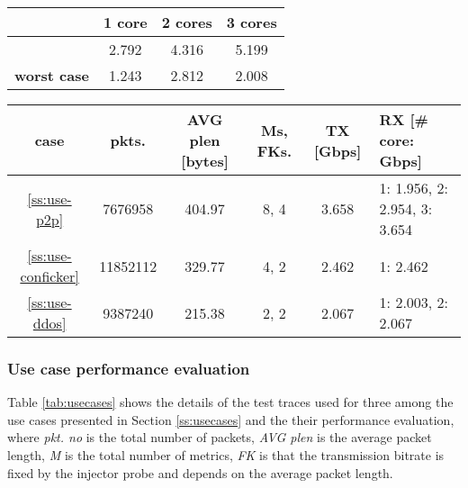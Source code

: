\documentclass[conference,letterpaper]{sig-alternate-10pt}
\begin{document}
\begin{center}
\begin{footnotesize}
\begin{tabular}{ | c | c | c | c| }
\hline
& \textbf{1 core} & \textbf{2 cores} & \textbf{3 cores} \\
\hline
\textbf{\cite{complex}} & 2.792  & 4.316 & 5.199 \\
\hline
\textbf{worst case} & 1.243 & 2.812 & 2.008 \\
\hline
\end{tabular}
\end{footnotesize}
\end{center}

\begin{table*}
\hfill{}
\begin{center}
\begin{footnotesize}
\begin{tabular}{ | c | c | c | c | c | l |}
\hline
\textbf{case} & \textbf{pkts}. & \textbf{AVG plen [bytes]} & \textbf{Ms, FKs.}& \textbf{TX [Gbps]} & \textbf{RX [\# core: Gbps]}\\
\hline
\ref{ss:use-p2p} & 7676958 & 404.97 & 8, 4  & 3.658 & 1: 1.956,  2: 2.954,  3: 3.654\\
\hline
\ref{ss:use-conficker} & 11852112 & 329.77 & 4, 2 & 2.462 & 1: 2.462 \\
\hline
\ref{ss:use-ddos} & 9387240 & 215.38 & 2, 2 & 2.067 & 1: 2.003, 2: 2.067\\
\hline
\end{tabular}
\caption{Use case trace parameters and throughput}
\vspace*{-.5cm}
\label{tab:usecases}
\end{footnotesize}
\end{center}
\end{table*}

\subsubsection{Use case performance evaluation}
\label{ss:use-perf}
Table \ref{tab:usecases} shows the details of the test traces used for three among the use cases presented in Section \ref{ss:usecases} and the their performance evaluation, where \emph{pkt. no} is the total number of packets, \emph{AVG plen} is the average packet length, \emph{M} is the total number of metrics, \emph{FK} is that the transmission bitrate is fixed by the injector probe and depends on the average packet length. 
\end{document}
